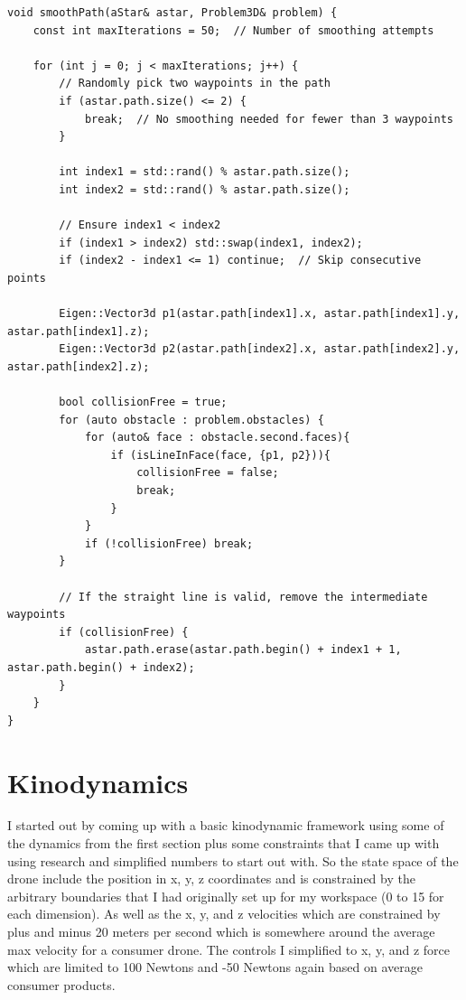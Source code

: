 \documentclass{article}
\begin{document}
\begin{lstlisting}[style=cppstyle]
void smoothPath(aStar& astar, Problem3D& problem) {
    const int maxIterations = 50;  // Number of smoothing attempts

    for (int j = 0; j < maxIterations; j++) {
        // Randomly pick two waypoints in the path
        if (astar.path.size() <= 2) {
            break;  // No smoothing needed for fewer than 3 waypoints
        }

        int index1 = std::rand() % astar.path.size();
        int index2 = std::rand() % astar.path.size();

        // Ensure index1 < index2
        if (index1 > index2) std::swap(index1, index2);
        if (index2 - index1 <= 1) continue;  // Skip consecutive points

        Eigen::Vector3d p1(astar.path[index1].x, astar.path[index1].y, astar.path[index1].z);
        Eigen::Vector3d p2(astar.path[index2].x, astar.path[index2].y, astar.path[index2].z);

        bool collisionFree = true;
        for (auto obstacle : problem.obstacles) {
            for (auto& face : obstacle.second.faces){
                if (isLineInFace(face, {p1, p2})){
                    collisionFree = false;
                    break;
                } 
            }
            if (!collisionFree) break;
        }

        // If the straight line is valid, remove the intermediate waypoints
        if (collisionFree) {
            astar.path.erase(astar.path.begin() + index1 + 1, astar.path.begin() + index2);
        }
    }
}
\end{lstlisting}

\section*{Kinodynamics}

I started out by coming up with a basic kinodynamic framework using some of the dynamics from the first section plus some constraints that I came up with using research and simplified numbers to start out with.
So the state space of the drone include the position in x, y, z coordinates and is constrained by the arbitrary boundaries that I had originally set up for my workspace (0 to 15 for each dimension).
As well as the x, y, and z velocities which are constrained by plus and minus 20 meters per second which is somewhere around the average max velocity for a consumer drone.
The controls I simplified to x, y, and z force which are limited to 100 Newtons and -50 Newtons again based on average consumer products.
\end{document}
